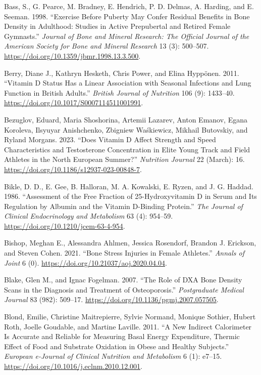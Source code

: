 \documentclass[
]{article}
\newlength{\cslhangindent}
\newenvironment{CSLReferences}[2] %
 {\begin{list}{}{%
  \setlength{\itemindent}{0pt}
  \setlength{\leftmargin}{0pt}
  \setlength{\parsep}{0pt}
  \ifodd #1
   \setlength{\leftmargin}{\cslhangindent}
   \setlength{\itemindent}{-1\cslhangindent}
  \fi
  \setlength{\itemsep}{#2\baselineskip}}}
 {\end{list}}
\begin{document}
\begin{CSLReferences}{1}{0}
Bass, S., G. Pearce, M. Bradney, E. Hendrich, P. D. Delmas, A. Harding, and E. Seeman. 1998. {``Exercise Before Puberty May Confer Residual Benefits in Bone Density in Adulthood: Studies in Active Prepubertal and Retired Female Gymnasts.''} \emph{Journal of Bone and Mineral Research: The Official Journal of the American Society for Bone and Mineral Research} 13 (3): 500--507. \url{https://doi.org/10.1359/jbmr.1998.13.3.500}.

Berry, Diane J., Kathryn Hesketh, Chris Power, and Elina Hyppönen. 2011. {``Vitamin {D} Status Has a Linear Association with Seasonal Infections and Lung Function in {British} Adults.''} \emph{British Journal of Nutrition} 106 (9): 1433--40. \url{https://doi.org/10.1017/S0007114511001991}.

Bezuglov, Eduard, Maria Shoshorina, Artemii Lazarev, Anton Emanov, Egana Koroleva, Ilsyuyar Anishchenko, Zbigniew Waśkiewicz, Mikhail Butovskiy, and Ryland Morgans. 2023. {``Does Vitamin {D} Affect Strength and Speed Characteristics and Testosterone Concentration in Elite Young Track and Field Athletes in the {North} {European} Summer?''} \emph{Nutrition Journal} 22 (March): 16. \url{https://doi.org/10.1186/s12937-023-00848-7}.

Bikle, D. D., E. Gee, B. Halloran, M. A. Kowalski, E. Ryzen, and J. G. Haddad. 1986. {``Assessment of the Free Fraction of 25-Hydroxyvitamin {D} in Serum and Its Regulation by Albumin and the Vitamin {D}-Binding Protein.''} \emph{The Journal of Clinical Endocrinology and Metabolism} 63 (4): 954--59. \url{https://doi.org/10.1210/jcem-63-4-954}.

Bishop, Meghan E., Alessandra Ahlmen, Jessica Rosendorf, Brandon J. Erickson, and Steven Cohen. 2021. {``Bone Stress Injuries in Female Athletes.''} \emph{Annals of Joint} 6 (0). \url{https://doi.org/10.21037/aoj.2020.04.04}.

Blake, Glen M., and Ignac Fogelman. 2007. {``The Role of {DXA} Bone Density Scans in the Diagnosis and Treatment of Osteoporosis.''} \emph{Postgraduate Medical Journal} 83 (982): 509--17. \url{https://doi.org/10.1136/pgmj.2007.057505}.

Blond, Emilie, Christine Maitrepierre, Sylvie Normand, Monique Sothier, Hubert Roth, Joelle Goudable, and Martine Laville. 2011. {``A New Indirect Calorimeter Is Accurate and Reliable for Measuring Basal Energy Expenditure, Thermic Effect of Food and Substrate Oxidation in Obese and Healthy Subjects.''} \emph{European e-Journal of Clinical Nutrition and Metabolism} 6 (1): e7--15. \url{https://doi.org/10.1016/j.eclnm.2010.12.001}.


\end{CSLReferences}
\end{document}
